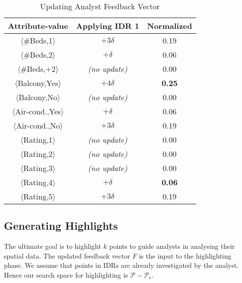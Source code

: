 \documentclass[sigconf,edbt]{acmart-edbt2019}
\begin{document}
\begin{table}[t]
\centering
\caption{Updating Analyst Feedback Vector}
\label{tbl:feedback}
\begin{tabular}{|c|c|c|}
\hline
\textbf{Attribute-value}               & \textbf{Applying IDR 1} & \textbf{Normalized} \\ \hline
$\langle$\#Beds,1$\rangle$                   & $+3\delta$                       & 0.19                 \\ \hline
$\langle$\#Beds,2$\rangle$                 & $+\delta$                       & 0.06                 \\ \hline
$\langle$\#Beds,+2$\rangle$                  & {\em (no update)}                       & 0.00                    \\ \hline
$\langle$Balcony,Yes$\rangle$                   & $+4\delta$                      & {\bf 0.25}                 \\ \hline
$\langle$Balcony,No$\rangle$                    & {\em (no update)}                        & 0.00                    \\ \hline
$\langle$Air-cond.,Yes$\rangle$               & $+\delta$                       & 0.06                 \\ \hline
$\langle$Air-cond.,No$\rangle$                & $+3\delta$                       & 0.19                 \\ \hline
$\langle$Rating,1$\rangle$                    & {\em (no update)}                       & 0.00                    \\ \hline
$\langle$Rating,2$\rangle$                     & {\em (no update)}                        & 0.00                    \\ \hline
$\langle$Rating,3$\rangle$                    & {\em (no update)}                        & 0.00                   \\ \hline
$\langle$Rating,4$\rangle$                   & $+\delta$                       & {\bf 0.06}                 \\ \hline
$\langle$Rating,5$\rangle$                     & $+3\delta$                      & 0.19                 \\ \hline
\end{tabular}
\end{table}

\subsection{Generating Highlights}
The ultimate goal is to highlight $k$ points to guide analysts in analysing their spatial data. The updated feedback vector $F$ is the input to the highlighting phase. We assume that points in IDRs are already investigated by the analyst. Hence our search space for highlighting is $\mathcal{P} - \mathcal{P}_s$.
\end{document}
